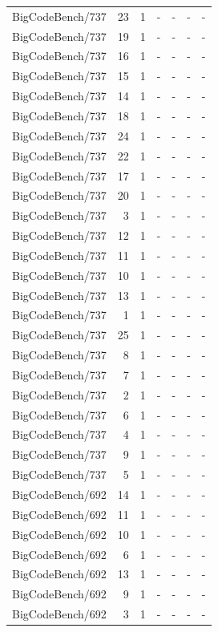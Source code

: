 \begin{longtable}{lrrllll}
BigCodeBench/737 & 23 & 1 & - & - & - & - \\
BigCodeBench/737 & 19 & 1 & - & - & - & - \\
BigCodeBench/737 & 16 & 1 & - & - & - & - \\
BigCodeBench/737 & 15 & 1 & - & - & - & - \\
BigCodeBench/737 & 14 & 1 & - & - & - & - \\
BigCodeBench/737 & 18 & 1 & - & - & - & - \\
BigCodeBench/737 & 24 & 1 & - & - & - & - \\
BigCodeBench/737 & 22 & 1 & - & - & - & - \\
BigCodeBench/737 & 17 & 1 & - & - & - & - \\
BigCodeBench/737 & 20 & 1 & - & - & - & - \\
BigCodeBench/737 & 3 & 1 & - & - & - & - \\
BigCodeBench/737 & 12 & 1 & - & - & - & - \\
BigCodeBench/737 & 11 & 1 & - & - & - & - \\
BigCodeBench/737 & 10 & 1 & - & - & - & - \\
BigCodeBench/737 & 13 & 1 & - & - & - & - \\
BigCodeBench/737 & 1 & 1 & - & - & - & - \\
BigCodeBench/737 & 25 & 1 & - & - & - & - \\
BigCodeBench/737 & 8 & 1 & - & - & - & - \\
BigCodeBench/737 & 7 & 1 & - & - & - & - \\
BigCodeBench/737 & 2 & 1 & - & - & - & - \\
BigCodeBench/737 & 6 & 1 & - & - & - & - \\
BigCodeBench/737 & 4 & 1 & - & - & - & - \\
BigCodeBench/737 & 9 & 1 & - & - & - & - \\
BigCodeBench/737 & 5 & 1 & - & - & - & - \\
BigCodeBench/692 & 14 & 1 & - & - & - & - \\
BigCodeBench/692 & 11 & 1 & - & - & - & - \\
BigCodeBench/692 & 10 & 1 & - & - & - & - \\
BigCodeBench/692 & 6 & 1 & - & - & - & - \\
BigCodeBench/692 & 13 & 1 & - & - & - & - \\
BigCodeBench/692 & 9 & 1 & - & - & - & - \\
BigCodeBench/692 & 3 & 1 & - & - & - & - \\

\end{longtable}
